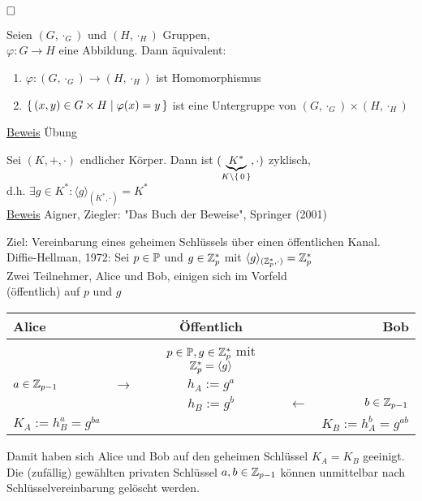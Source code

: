 \documentclass{../../meta/tudscript}
\begin{document}
			$\hfill\square$
			
			Seien $(G, \cdot_G)$ und $(H, \cdot_H)$ Gruppen,\\
			$\varphi : G \rightarrow H$ eine Abbildung. Dann äquivalent:
			\begin{enumerate}
				\item $\varphi : (G, \cdot_G) \rightarrow (H, \cdot_H)$ ist Homomorphismus
				\item $\set{ (x,y) \in G \times H | \varphi (x) = y }$ ist eine Untergruppe von $(G, \cdot_G) \times (H, \cdot_H)$
			\end{enumerate}
			
			\underline{Beweis} Übung
			
		
			Sei $(K, +, \cdot)$ endlicher Körper. Dann ist $(\underbrace{K^*}_{K \setminus \set{0}}, \cdot)$ zyklisch,\\
			d.h. $\exists g \in K^* : \langle g \rangle_{(K^*, \cdot)} = K^*$ \\
			
			\underline{Beweis} Aigner, Ziegler: "Das Buch der Beweise", Springer (2001)
				
			Ziel: Vereinbarung eines geheimen Schlüssels über einen öffentlichen Kanal. \\
			Diffie-Hellman, 1972: Sei $p \in \mathbb{P}$ und $g \in \mathbb{Z}^*_p$ mit $\langle g \rangle_{(\mathbb{Z}^*_p, \cdot)} = \mathbb{Z}^*_p$ \\
			Zwei Teilnehmer, Alice und Bob, einigen sich im Vorfeld\\
			(öffentlich) auf $p$ und $g$ \\
			
			\begin{tabular}{ l c c c r }
				Alice & & Öffentlich & & Bob \\
				\hline
				 & & $p\in \mathbb{P}, g \in \mathbb{Z}^*_p$ mit $\mathbb{Z}^*_p = \langle g \rangle$ & & \\
				$a \in \mathbb{Z}_{p-1}$ & $\rightarrow$ & $h_A := g^a$ & & \\
				 & & $h_B := g^b$ & $\leftarrow$ & $b \in \mathbb{Z}_{p-1}$ \\
				$K_A := h^a_B = g^{ba}$ & & & & $K_B := h^b_A = g^{ab}$
			\end{tabular}
			
			Damit haben sich Alice und Bob auf den geheimen Schlüssel $K_A=K_B$ geeinigt. Die (zufällig) gewählten privaten Schlüssel $a,b \in \mathbb{Z}_{p-1}$ können unmittelbar nach Schlüsselvereinbarung gelöscht werden.
			
\end{document}
